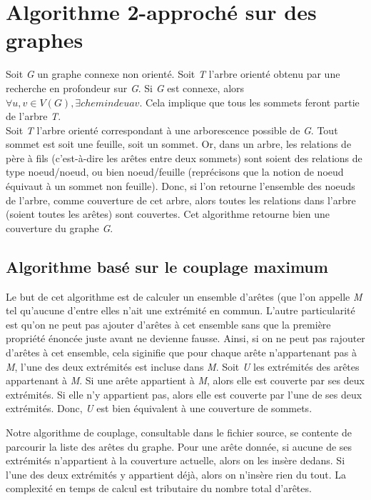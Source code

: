 
\section{Algorithme 2-approch\'e sur des graphes}

Soit \textit{G} un graphe connexe non orient\'e. Soit \textit{T} l'arbre orient\'e obtenu par une recherche en profondeur sur \textit{G}.
Si \textit{G} est connexe, alors \textit{$\forall u,v \in V(G), \exists chemin de u a v$}. Cela implique que tous les sommets
feront partie de l'arbre \textit{T}.\\

Soit \textit{T} l'arbre orient\'e correspondant \`a une arborescence possible de \textit{G}. Tout sommet est soit une feuille,
soit un sommet. Or, dans un arbre, les relations de p\`ere \`a fils (c'est-\`a-dire les ar\^etes entre deux sommets) sont soient
des relations de type noeud/noeud, ou bien noeud/feuille (repr\'ecisons que la notion de noeud \'equivaut \`a un sommet non feuille).
Donc, si l'on retourne l'ensemble des noeuds de l'arbre, comme couverture de cet arbre, alors toutes les relations dans l'arbre (soient
toutes les ar\^etes) sont couvertes. Cet algorithme retourne bien une couverture du graphe \textit{G}.


\subsection{Algorithme bas\'e sur le couplage maximum}

Le but de cet algorithme est de calculer un ensemble d'ar\^etes (que l'on appelle \textit{M} tel qu'aucune d'entre elles n'ait une
extr\'emit\'e en commun. L'autre particularit\'e est qu'on ne peut pas ajouter d'ar\^etes \`a cet ensemble sans que la premi\`ere
propri\'et\'e \'enonc\'ee juste avant ne devienne fausse. Ainsi, si on ne peut pas rajouter d'ar\^etes \`a cet ensemble, cela siginifie
que pour chaque ar\^ete n'appartenant pas \`a \textit{M}, l'une des deux extr\'emit\'es est incluse dans \textit{M}. Soit \textit{U} les
extr\'emit\'es des ar\^etes appartenant \`a \textit{M}. Si une ar\^ete appartient \`a \textit{M}, alors elle est couverte par ses
deux extr\'emit\'es. Si elle n'y appartient pas, alors elle est couverte par l'une de ses deux extr\'emit\'es. Donc, \textit{U}
est bien \'equivalent \`a une couverture de sommets.

Notre algorithme de couplage, consultable dans le fichier source, se contente de parcourir la liste des ar\^etes du graphe. Pour une ar\^ete
donn\'ee, si aucune de ses extr\'emit\'es n'appartient \`a la couverture actuelle, alors on les ins\`ere dedans. Si l'une des deux extr\'emit\'es
y appartient d\'ej\`a, alors on n'ins\`ere rien du tout. La complexit\'e en temps de calcul est tributaire du nombre total d'ar\^etes.


